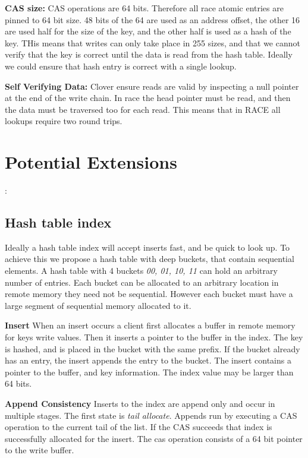 \textbf{CAS size:} CAS operations are 64 bits. Therefore all race atomic entries
are pinned to 64 bit size. 48 bits of the 64 are used as an address offset, the
other 16 are used half for the size of the key, and the other half is used as a
hash of the key. THis means that writes can only take place in 255 sizes, and
that we cannot verify that the key is correct until the data is read from the
hash table. Ideally we could ensure that hash entry is correct with a single lookup.

\textbf{Self Verifying Data:} Clover ensure reads are valid by inspecting a null
pointer at the end of the write chain. In race the head pointer must be read,
and then the data must be traversed too for each read. This means that in RACE
all lookups require two round trips.

\section{Potential Extensions}:

\subsection{Hash table index}

Ideally a hash table index will accept inserts fast, and be quick to look up. To
achieve this we propose a hash table with deep buckets, that contain sequential
elements. A hash table with 4 buckets \textit{00, 01, 10, 11} can hold an
arbitrary number of entries. Each bucket can be allocated to an arbitrary
location in remote memory they need not be sequential. However each bucket must
have a large segment of sequential memory allocated to it.

\textbf{Insert} When an insert occurs a client first allocates a buffer in
remote memory for keys write values. Then it inserts a pointer to the buffer in
the index. The key is hashed, and is placed in the bucket with the same prefix.
If the bucket already has an entry, the insert appends the entry to the bucket.
The insert contains a pointer to the buffer, and key information. The index
value may be larger than 64 bits.

\textbf{Append Consistency} Inserts to the index are append only and occur in
multiple stages. The first state is \textit{tail allocate}. Appends run by
executing a CAS operation to the current tail of the list. If the CAS succeeds
that index is successfully allocated for the insert. The cas operation consists
of a 64 bit pointer to the write buffer.

